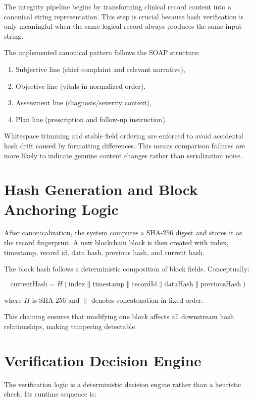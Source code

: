 \documentclass[12pt,a4paper]{report}
\begin{document}
The integrity pipeline begins by transforming clinical record content into a canonical string representation. This step is crucial because hash verification is only meaningful when the same logical record always produces the same input string.

The implemented canonical pattern follows the SOAP structure:

\begin{enumerate}
\item Subjective line (chief complaint and relevant narrative),
\item Objective line (vitals in normalized order),
\item Assessment line (diagnosis/severity context),
\item Plan line (prescription and follow-up instruction).
\end{enumerate}

Whitespace trimming and stable field ordering are enforced to avoid accidental hash drift caused by formatting differences. This means comparison failures are more likely to indicate genuine content changes rather than serialization noise.

\section{Hash Generation and Block Anchoring Logic}

After canonicalization, the system computes a SHA-256 digest and stores it as the record fingerprint. A new blockchain block is then created with index, timestamp, record id, data hash, previous hash, and current hash.

The block hash follows a deterministic composition of block fields. Conceptually:

$$
\mathrm{currentHash} = H(\mathrm{index} \parallel \mathrm{timestamp} \parallel \mathrm{recordId} \parallel \mathrm{dataHash} \parallel \mathrm{previousHash})
$$

where $H$ is SHA-256 and $\parallel$ denotes concatenation in fixed order.

This chaining ensures that modifying one block affects all downstream hash relationships, making tampering detectable.

\section{Verification Decision Engine}

The verification logic is a deterministic decision engine rather than a heuristic check. Its runtime sequence is:
\end{document}
